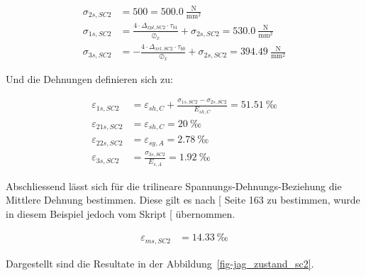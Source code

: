 \documentclass[
  11pt,
  letterpaper,
]{scrreprt}
\begin{document}
\[
\begin{aligned}
\sigma_{2 s , SC2}& = 500 = 500.0 \ \frac{\mathrm{N}}{\mathrm{mm}^{2}} \\ 
\sigma_{1 s , SC2}& = \frac{4 \cdot \Delta_{x pl , SC2} \cdot \tau_{b1}}{\oslash_{x}} + \sigma_{2 s , SC2} = 530.0 \ \frac{\mathrm{N}}{\mathrm{mm}^{2}} \\ 
\sigma_{3 s , SC2}& = - \frac{4 \cdot \Delta_{x el , SC2} \cdot \tau_{b0}}{\oslash_{x}} + \sigma_{2 s , SC2} = 394.49 \ \frac{\mathrm{N}}{\mathrm{mm}^{2}} \end{aligned}
\]

Und die Dehnungen definieren sich zu:

\[
\begin{aligned}
\varepsilon_{1 s , SC2}& = \varepsilon_{sh , C} + \frac{\sigma_{1 s , SC2} - \sigma_{2 s , SC2}}{E_{sh , C}} = 51.51 \ \mathrm{‰} \\ 
\varepsilon_{21 s , SC2}& = \varepsilon_{sh , C} = 20 \ \mathrm{‰} \\ 
\varepsilon_{22 s , SC2}& = \varepsilon_{sy , A} = 2.78 \ \mathrm{‰} \\ 
\varepsilon_{3 s , SC2}& = \frac{\sigma_{3 s , SC2}}{E_{s , A}} = 1.92 \ \mathrm{‰} \end{aligned}
\]

Abschliessend lässt sich für die trilineare Spannungs-Dehnungs-Beziehung
die Mittlere Dehnung bestimmen. Diese gilt es nach
{[}\citeproc{ref-alvarez_einfluss_1998}{6}{]} Seite 163 zu bestimmen,
wurde in diesem Beispiel jedoch vom Skript
{[}\citeproc{ref-jager_stahlbeton_2009}{2}{]} übernommen.

\[
\begin{aligned}
\varepsilon_{m s , SC2}& = 14.33 \ \mathrm{‰} \end{aligned}
\]

Dargestellt sind die Resultate in der
Abbildung~\ref{fig-jag_zustand_sc2}.
\end{document}
